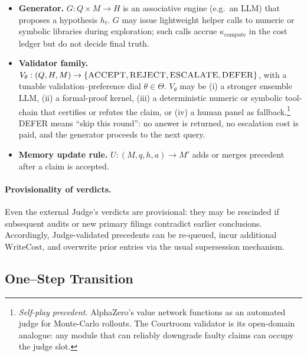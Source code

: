 \documentclass[11pt]{article}
\newcommand{\WriteCost}{\mathrm{WriteCost}}
\begin{document}
\begin{itemize}
  \item \textbf{Generator.}  
  \(G : Q \times M \to H\) is an associative engine (e.g.\ an LLM) that proposes a
  hypothesis \(h_t\).  
  \(G\) may issue lightweight helper calls to numeric or symbolic libraries
  during exploration; such calls accrue \(\kappa_{\text{compute}}\) in the cost ledger
  but do not decide final truth.
  
  \item \textbf{Validator family.}  
  \(V_{\theta} : (Q, H, M) \to \{\textsc{ACCEPT}, \textsc{REJECT}, \textsc{ESCALATE}, \textsc{DEFER}\}\), with a
  tunable validation–preference dial \(\theta \in \Theta\).
  \(V_{\theta}\) may be
  (i) a stronger ensemble LLM,
  (ii) a formal-proof kernel,
  (iii) a deterministic numeric or symbolic tool-chain that certifies or refutes the claim, or
  (iv) a human panel as fallback.\footnote{\textit{Self-play precedent.}  
  AlphaZero's value network functions as an automated judge for Monte-Carlo rollouts.
  The Courtroom validator is its open-domain analogue: any module that can reliably
  downgrade faulty claims can occupy the judge slot.} \textsc{DEFER} means “skip this round”: no answer is returned,
  no escalation cost is paid, and the generator proceeds to the next
  query.
  
  \item \textbf{Memory update rule.}  
  \(U : (M, q, h, a) \to M'\) adds or merges precedent after a claim is accepted.
  
  \end{itemize}

\paragraph{Provisionality of verdicts.}
Even the external Judge’s verdicts are provisional: they may be rescinded
if subsequent audits or new primary filings contradict earlier
conclusions.  Accordingly, Judge-validated precedents can be re-queued,
incur additional \(\WriteCost\), and overwrite prior entries via the usual
supersession mechanism.

\subsection{One--Step Transition}
\label{sec:transition}
\end{document}
